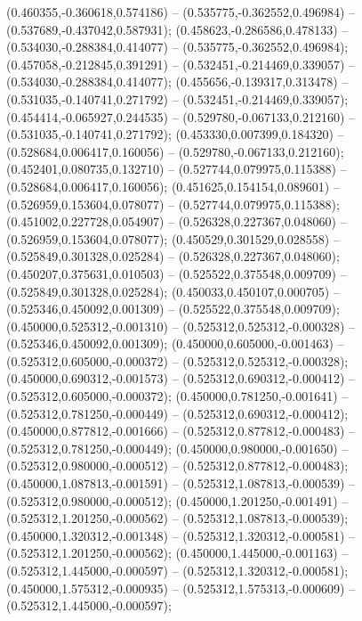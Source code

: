  (0.460355,-0.360618,0.574186) -- (0.535775,-0.362552,0.496984) -- (0.537689,-0.437042,0.587931);
 (0.458623,-0.286586,0.478133) -- (0.534030,-0.288384,0.414077) -- (0.535775,-0.362552,0.496984);
 (0.457058,-0.212845,0.391291) -- (0.532451,-0.214469,0.339057) -- (0.534030,-0.288384,0.414077);
 (0.455656,-0.139317,0.313478) -- (0.531035,-0.140741,0.271792) -- (0.532451,-0.214469,0.339057);
 (0.454414,-0.065927,0.244535) -- (0.529780,-0.067133,0.212160) -- (0.531035,-0.140741,0.271792);
 (0.453330,0.007399,0.184320) -- (0.528684,0.006417,0.160056) -- (0.529780,-0.067133,0.212160);
 (0.452401,0.080735,0.132710) -- (0.527744,0.079975,0.115388) -- (0.528684,0.006417,0.160056);
 (0.451625,0.154154,0.089601) -- (0.526959,0.153604,0.078077) -- (0.527744,0.079975,0.115388);
 (0.451002,0.227728,0.054907) -- (0.526328,0.227367,0.048060) -- (0.526959,0.153604,0.078077);
 (0.450529,0.301529,0.028558) -- (0.525849,0.301328,0.025284) -- (0.526328,0.227367,0.048060);
 (0.450207,0.375631,0.010503) -- (0.525522,0.375548,0.009709) -- (0.525849,0.301328,0.025284);
 (0.450033,0.450107,0.000705) -- (0.525346,0.450092,0.001309) -- (0.525522,0.375548,0.009709);
 (0.450000,0.525312,-0.001310) -- (0.525312,0.525312,-0.000328) -- (0.525346,0.450092,0.001309);
 (0.450000,0.605000,-0.001463) -- (0.525312,0.605000,-0.000372) -- (0.525312,0.525312,-0.000328);
 (0.450000,0.690312,-0.001573) -- (0.525312,0.690312,-0.000412) -- (0.525312,0.605000,-0.000372);
 (0.450000,0.781250,-0.001641) -- (0.525312,0.781250,-0.000449) -- (0.525312,0.690312,-0.000412);
 (0.450000,0.877812,-0.001666) -- (0.525312,0.877812,-0.000483) -- (0.525312,0.781250,-0.000449);
 (0.450000,0.980000,-0.001650) -- (0.525312,0.980000,-0.000512) -- (0.525312,0.877812,-0.000483);
 (0.450000,1.087813,-0.001591) -- (0.525312,1.087813,-0.000539) -- (0.525312,0.980000,-0.000512);
 (0.450000,1.201250,-0.001491) -- (0.525312,1.201250,-0.000562) -- (0.525312,1.087813,-0.000539);
 (0.450000,1.320312,-0.001348) -- (0.525312,1.320312,-0.000581) -- (0.525312,1.201250,-0.000562);
 (0.450000,1.445000,-0.001163) -- (0.525312,1.445000,-0.000597) -- (0.525312,1.320312,-0.000581);
 (0.450000,1.575312,-0.000935) -- (0.525312,1.575313,-0.000609) -- (0.525312,1.445000,-0.000597);
